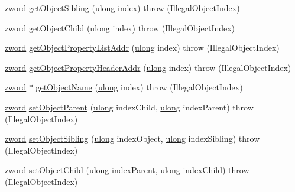 \begin{DoxyCompactItemize}
\item 
\hyperlink{zglobal_8h_a6507dc55d18847442d5fb20b6c73fe73}{zword} \hyperlink{class_z_object_table_a7c8e7d37438dd344ec0bb79de81eae13}{get\-Object\-Sibling} (\hyperlink{zglobal_8h_a718b4eb2652c286f4d42dc18a8e71a1a}{ulong} index)  throw (\-Illegal\-Object\-Index)
\item 
\hyperlink{zglobal_8h_a6507dc55d18847442d5fb20b6c73fe73}{zword} \hyperlink{class_z_object_table_abfbb91b1aac42c31e3f3b6f6be1dec43}{get\-Object\-Child} (\hyperlink{zglobal_8h_a718b4eb2652c286f4d42dc18a8e71a1a}{ulong} index)  throw (\-Illegal\-Object\-Index)
\item 
\hyperlink{zglobal_8h_a6507dc55d18847442d5fb20b6c73fe73}{zword} \hyperlink{class_z_object_table_adbad0758374585df5a515b453ced3730}{get\-Object\-Property\-List\-Addr} (\hyperlink{zglobal_8h_a718b4eb2652c286f4d42dc18a8e71a1a}{ulong} index)  throw (\-Illegal\-Object\-Index)
\item 
\hyperlink{zglobal_8h_a6507dc55d18847442d5fb20b6c73fe73}{zword} \hyperlink{class_z_object_table_a4811f880ec7c8853a008ef0911a5d8d0}{get\-Object\-Property\-Header\-Addr} (\hyperlink{zglobal_8h_a718b4eb2652c286f4d42dc18a8e71a1a}{ulong} index)  throw (\-Illegal\-Object\-Index)
\item 
\hyperlink{zglobal_8h_a6507dc55d18847442d5fb20b6c73fe73}{zword} $\ast$ \hyperlink{class_z_object_table_a13a0cc1794155cfd2e5876736b4e76da}{get\-Object\-Name} (\hyperlink{zglobal_8h_a718b4eb2652c286f4d42dc18a8e71a1a}{ulong} index)  throw (\-Illegal\-Object\-Index)
\item 
\hyperlink{zglobal_8h_a6507dc55d18847442d5fb20b6c73fe73}{zword} \hyperlink{class_z_object_table_a2630e740f9e1f5ecbc49a3ed2ba92b8e}{set\-Object\-Parent} (\hyperlink{zglobal_8h_a718b4eb2652c286f4d42dc18a8e71a1a}{ulong} index\-Child, \hyperlink{zglobal_8h_a718b4eb2652c286f4d42dc18a8e71a1a}{ulong} index\-Parent)  throw (\-Illegal\-Object\-Index)
\item 
\hyperlink{zglobal_8h_a6507dc55d18847442d5fb20b6c73fe73}{zword} \hyperlink{class_z_object_table_adb004bf8381717c458cff4546e161a05}{set\-Object\-Sibling} (\hyperlink{zglobal_8h_a718b4eb2652c286f4d42dc18a8e71a1a}{ulong} index\-Object, \hyperlink{zglobal_8h_a718b4eb2652c286f4d42dc18a8e71a1a}{ulong} index\-Sibling)  throw (\-Illegal\-Object\-Index)
\item 
\hyperlink{zglobal_8h_a6507dc55d18847442d5fb20b6c73fe73}{zword} \hyperlink{class_z_object_table_a4100f0edd10768a8ecb9a3412c2e3d2b}{set\-Object\-Child} (\hyperlink{zglobal_8h_a718b4eb2652c286f4d42dc18a8e71a1a}{ulong} index\-Parent, \hyperlink{zglobal_8h_a718b4eb2652c286f4d42dc18a8e71a1a}{ulong} index\-Child)  throw (\-Illegal\-Object\-Index)

\end{DoxyCompactItemize}
